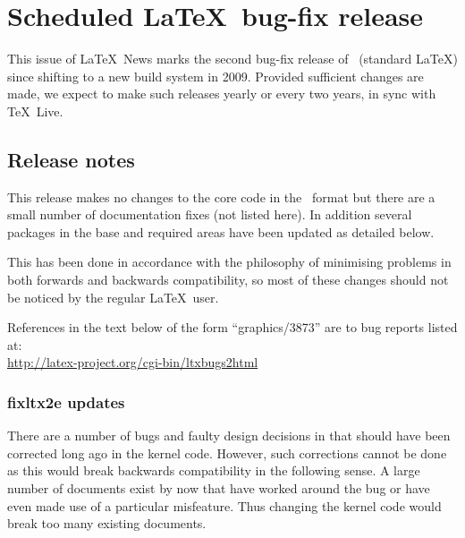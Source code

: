 \documentclass{ltnews}
\begin{document}
\maketitle

\tableofcontents

\bigskip

\section{Scheduled \LaTeX\ bug-fix release}

This issue of \LaTeX~News marks the second bug-fix release of
\LaTeXe\ (standard \LaTeX) since shifting to a new build system in 2009.
Provided sufficient changes are made, we expect to
make such releases yearly or every two years, in sync with \TeX\ Live.



\subsection{Release notes}

This release makes no changes to the core code in the \LaTeXe\ format
but there are a small number of documentation fixes (not listed
here). In addition several packages in the \textsf{base} and
\textsf{required} areas have been updated as detailed below.


This has been done in accordance with the philosophy of minimising
problems in both forwards and backwards compatibility, so most of
these changes should not be noticed by the regular \LaTeX\ user.

References in the text below of the form ``graphics/3873'' are to
bug reports listed
at:\\ \url{http://latex-project.org/cgi-bin/ltxbugs2html}


\let\paragraph\subsubsection

\paragraph{\textsf{fixltx2e} updates}



There are a number of bugs and faulty design decisions in \LaTeXe{}
that should have been corrected long ago in the kernel code.  However,
such corrections cannot be done as this would break backwards
compatibility in the following sense. A large number of documents
exist by now that have worked around the bug or have even made use of
a particular misfeature.  Thus changing the kernel code would break
too many existing documents.
\end{document}
